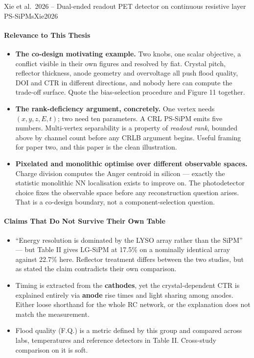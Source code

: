 \begin{papernote}{Xie et al.\ 2026 -- Dual-ended readout PET detector on continuous resistive layer PS-SiPMs}{Xie2026}
\paragraph{Relevance to This Thesis}
\begin{itemize}
	\item \textbf{The co-design motivating example.} Two knobs, one scalar
		objective, a conflict visible in their own figures and resolved by
		fiat. Crystal pitch, reflector thickness, anode geometry and overvoltage
		all push flood quality, DOI and CTR in different directions, and nobody
		here can compute the trade-off surface. Quote the bias-selection
		procedure and Figure 11 together.
	\item \textbf{The rank-deficiency argument, concretely.} One vertex needs
		$(x, y, z, E, t)$; two need ten parameters. A CRL PS-SiPM emits five
		numbers. Multi-vertex separability is a property of \emph{readout rank},
		bounded above by channel count before any CRLB argument begins. Useful
		framing for paper two, and this paper is the clean illustration.
	\item \textbf{Pixelated and monolithic optimise over different observable
		spaces.} Charge division computes the Anger centroid in silicon ---
		exactly the statistic monolithic NN localisation exists to improve on.
		The photodetector choice fixes the observable space before any
		reconstruction question arises. That is a co-design boundary, not a
		component-selection question.
\end{itemize}
 
\paragraph{Claims That Do Not Survive Their Own Table}
\begin{itemize}
	\item ``Energy resolution is dominated by the LYSO array rather than the
		SiPM'' --- but Table II gives LG-SiPM at 17.5\% on a nominally identical
		 array against 22.7\% here.
		Reflector treatment differs between the two studies, but as stated the
		claim contradicts their own comparison.
	\item Timing is extracted from the \textbf{cathodes}, yet the
		crystal-dependent CTR is explained entirely via \textbf{anode} rise
		times and light sharing among anodes. Either loose shorthand for the
		whole RC network, or the explanation does not match the measurement.
	\item Flood quality (F.Q.) is a metric defined by this group and compared
		across labs, temperatures and reference detectors in Table II.
		Cross-study comparison on it is soft.
\end{itemize}
 
\end{papernote}
 
